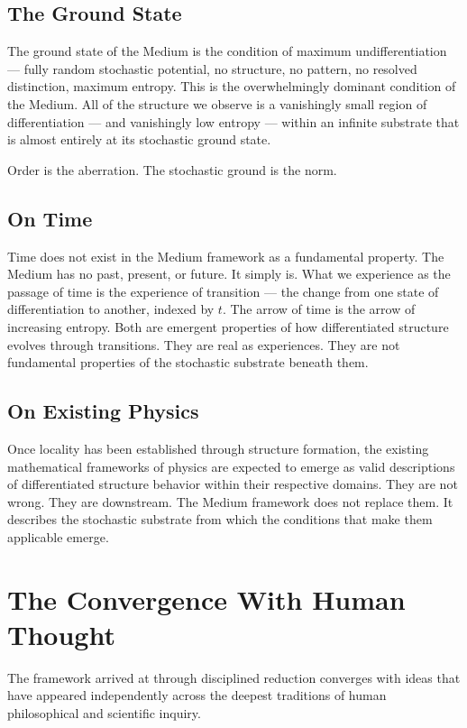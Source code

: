 \documentclass[11pt]{article}
\begin{document}
\subsection{The Ground State}
\label{sec:org4534998}

The ground state of the Medium is the condition of maximum undifferentiation —
fully random stochastic potential, no structure, no pattern, no resolved
distinction, maximum entropy. This is the overwhelmingly dominant condition of
the Medium. All of the structure we observe is a vanishingly small region of
differentiation — and vanishingly low entropy — within an infinite substrate that
is almost entirely at its stochastic ground state.

Order is the aberration. The stochastic ground is the norm.
\subsection{On Time}
\label{sec:orgabcae96}

Time does not exist in the Medium framework as a fundamental property. The Medium
has no past, present, or future. It simply is. What we experience as the passage
of time is the experience of transition — the change from one state of
differentiation to another, indexed by \(t\). The arrow of time is the arrow of
increasing entropy. Both are emergent properties of how differentiated structure
evolves through transitions. They are real as experiences. They are not
fundamental properties of the stochastic substrate beneath them.
\subsection{On Existing Physics}
\label{sec:org0b6fd7e}

Once locality has been established through structure formation, the existing
mathematical frameworks of physics are expected to emerge as valid descriptions
of differentiated structure behavior within their respective domains. They are
not wrong. They are downstream. The Medium framework does not replace them. It
describes the stochastic substrate from which the conditions that make them
applicable emerge.
\section{The Convergence With Human Thought}
\label{sec:orgd9a0190}

The framework arrived at through disciplined reduction converges with ideas that
have appeared independently across the deepest traditions of human philosophical
and scientific inquiry.
\end{document}
